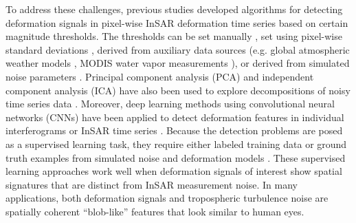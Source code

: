 To address these challenges, previous studies developed algorithms for detecting deformation signals in pixel-wise InSAR deformation time series based on certain magnitude thresholds. The thresholds can be set manually \cite{Raspini2018ContinuousSemiAutomatic}, set using pixel-wise standard deviations \cite{Bekaert2020InsarBasedDetection}, derived from auxiliary data sources (e.g. global atmospheric weather models \cite{Parker2015SystematicAssessmentAtmospheric}, MODIS water vapor measurements \cite{Barnhart2013CharacterizingEstimatingNoise}), or derived from simulated noise parameters \cite{Havazli2021DetectionThresholdEstimates}. Principal component analysis (PCA) and independent component analysis (ICA) have also been used to explore decompositions of noisy time series data \cite{Chaussard2014PredictabilityHydraulicHead, Ebmeier2016ApplicationIndependentComponent, Gaddes2018BlindSignalSeparation}. Moreover, deep learning methods using convolutional neural networks (CNNs) have been applied to detect deformation features in individual interferograms \cite{Anantrasirichai2018ApplicationMachineLearning, Anantrasirichai2019ApplicationConvolutionalNeural} or InSAR time series \cite{RouetLeduc2021AutonomousExtractionMillimeter}. Because the detection problems are posed as a supervised learning task, they require either labeled training data \cite{Anantrasirichai2018ApplicationMachineLearning} or ground truth examples from simulated noise and deformation models \cite{Anantrasirichai2019DeepLearningApproach, RouetLeduc2021AutonomousExtractionMillimeter}. These supervised learning approaches work well when deformation signals of interest show spatial signatures that are distinct from InSAR measurement noise. In many applications, both deformation signals and tropospheric turbulence noise are spatially coherent ``blob-like'' features that look similar to human eyes.


